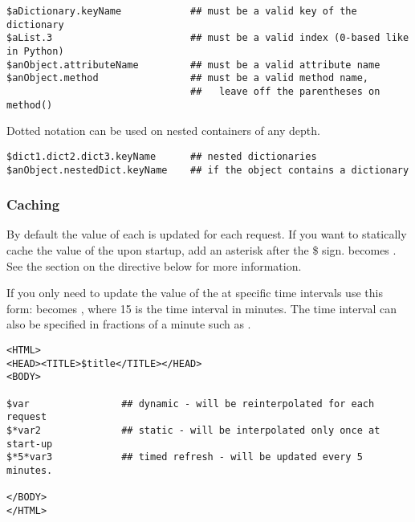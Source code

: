 \begin{verbatim}
$aDictionary.keyName            ## must be a valid key of the dictionary 
$aList.3                        ## must be a valid index (0-based like in Python)
$anObject.attributeName         ## must be a valid attribute name
$anObject.method                ## must be a valid method name, 
                                ##   leave off the parentheses on method()
\end{verbatim}


Dotted notation can be used on nested containers of any depth.
\begin{verbatim}
$dict1.dict2.dict3.keyName      ## nested dictionaries
$anObject.nestedDict.keyName    ## if the object contains a dictionary
\end{verbatim}


\subsubsection{Caching}

By default the value of each  is updated for each request.
If you want to statically cache the value of the  upon
startup, add an asterisk after the \$ sign.   becomes .
See the section on the  directive below for more information.

If you only need to update the value of the  at specific time intervals use
this form:  becomes  , where 15 is the time interval in
minutes.  The time interval can also be specified in fractions of a minute such
as .

\begin{verbatim}
<HTML>
<HEAD><TITLE>$title</TITLE></HEAD>
<BODY>

$var                ## dynamic - will be reinterpolated for each request
$*var2              ## static - will be interpolated only once at start-up
$*5*var3            ## timed refresh - will be updated every 5 minutes.

</BODY>
</HTML>
\end{verbatim}


